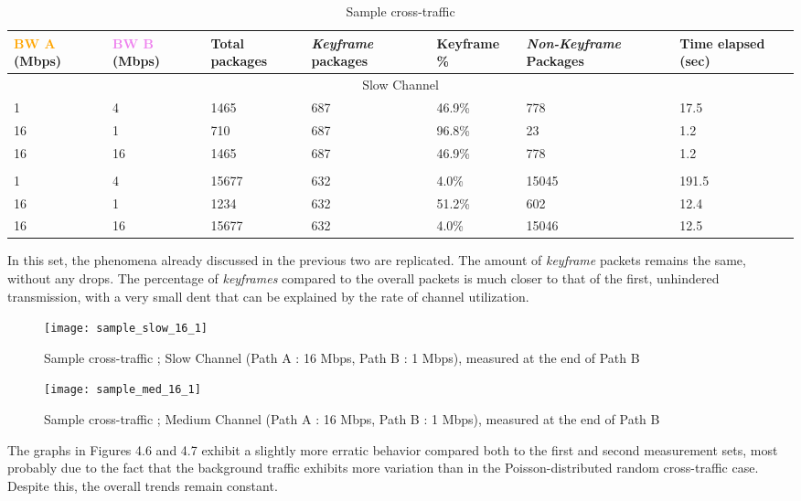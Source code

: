 \begin{table}[htbp]
\break
\setlength{\arrayrulewidth}{1mm}
\setlength{\tabcolsep}{12pt}
\renewcommand{\arraystretch}{1.5}
 {
\begin{tabular}{ |p{1.375cm}|p{1.375cm}|p{1.25cm}|p{1.5cm}|p{1.5cm}|p{1.75cm}|p{1.5cm}| }
\hline
\textcolor{orange}{BW A} (Mbps)&\textcolor{violet}{BW B} (Mbps)& Total packages & \textit{Keyframe} packages & Keyframe \% & \textit{Non-Keyframe} Packages & Time elapsed (sec) \\
\hline
\multicolumn{7}{|c|}{Slow Channel} \\
\hline
1&4&1465&687&46.9\%&778&17.5\\
16&1&710&687&96.8\%&23&1.2\\
16&16&1465&687&46.9\%&778&1.2\\
\hline
\rowcolor{white}\multicolumn{7}{|c|}{Medium Channel} \\
\hline
1&4&15677&632&4.0\%&15045&191.5\\
16&1&1234&632&51.2\%&602&12.4\\
16&16&15677&632&4.0\%&15046&12.5\\
\hline
\end{tabular}
}
\caption{Sample cross-traffic}
\end{table}

In this set, the phenomena already discussed in the previous two are replicated. The amount of \textit{keyframe} packets remains the same, without any drops. The percentage of \textit{keyframes} compared to the overall packets is much closer to that of the first, unhindered transmission, with a very small dent that can be explained by the rate of channel utilization.

\begin{figure}[!h]
\centering
\texttt{[image: sample\_slow\_16\_1]}
\caption{Sample cross-traffic ; Slow Channel (Path A : 16 Mbps, Path B : 1 Mbps), measured at the end of Path B}
\end{figure}

\begin{figure}[!h]
\centering
\texttt{[image: sample\_med\_16\_1]}
\caption{Sample cross-traffic ; Medium Channel (Path A : 16 Mbps, Path B : 1 Mbps), measured at the end of Path B}
\end{figure}

The graphs in Figures 4.6 and 4.7 exhibit a slightly more erratic behavior compared both to the first and second measurement sets, most probably due to the fact that the background traffic exhibits more variation than in the Poisson-distributed random cross-traffic case. Despite this, the overall trends remain constant. 

